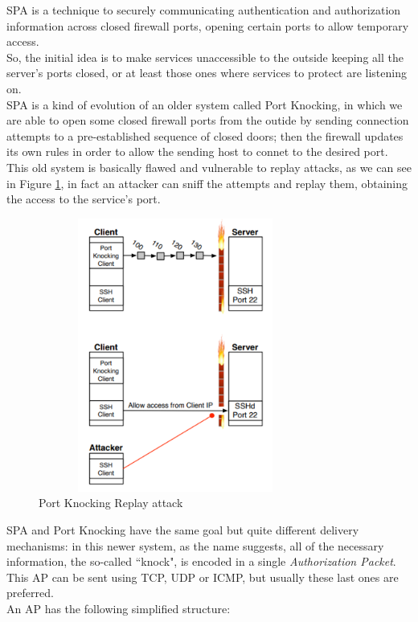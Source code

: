 \documentclass[12pt]{report}
\begin{document}
{{SPA is a technique to securely communicating authentication and authorization information across closed firewall ports, opening certain ports to allow temporary access.\\
So, the initial idea is to make services unaccessible to the outside keeping all the server's ports closed, or at least those ones where services to protect are listening on.\\

SPA is a kind of evolution of an older system called Port Knocking, in which we are able to  open some closed firewall ports from the outide by sending connection attempts to a pre-established sequence of closed doors; then the firewall updates its own rules in order to allow the sending host to connet to the desired port.\\
This old system is basically flawed and vulnerable to replay attacks, as we can see in Figure \ref{fig:portknocking}, in fact an attacker can sniff the attempts and replay them, obtaining the access to the service's port.\\

\begin{figure}[H]
\includegraphics[width=9cm,height=9cm,keepaspectratio]{port_knocking}
\centering
\caption{Port Knocking Replay attack}
\label{fig:portknocking}
\end{figure}

SPA and Port Knocking have the same goal but quite different delivery mechanisms: in this newer system, as the name suggests, all of the necessary information, the so-called ``knock", is encoded in a single \emph{Authorization Packet}.\\
This AP can be sent using TCP, UDP or ICMP, but usually these last ones are preferred.\\
An AP has the following simplified structure:

}}
\end{document}
